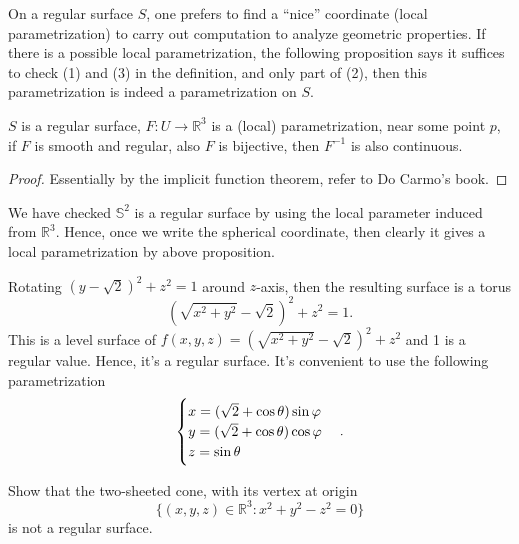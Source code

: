 On a regular surface \(S\), one prefers to find a ``nice'' coordinate
(local parametrization) to carry out computation to analyze geometric properties.
If there is a possible local parametrization, the following proposition says it
suffices to check (1) and (3) in the definition, and only part of (2), then this
parametrization is indeed a parametrization on \(S\).
\begin{prop}
    \(S\) is a regular surface, \(F\colon U\to \mathbb{R}^3\) is a (local)
    parametrization, near some point \(p\), if \(F\) is smooth and regular, also
    \(F\) is bijective, then \(F^{-1}\) is also continuous.
\end{prop}
\begin{proof}
    Essentially by the implicit function theorem, refer to Do Carmo's book.
\end{proof}

\begin{example}
    We have checked \(\mathbb{S}^2\) is a regular surface by using the local
    parameter induced from \(\mathbb{R}^3\). Hence, once we write the spherical
    coordinate, then clearly it gives a local parametrization by above proposition.
\end{example}

\begin{example}[Torus]
    Rotating \((y-\sqrt{2})^2+z^2=1\) around \(z\)-axis, then the resulting surface
    is a torus \[
        (\sqrt{x^2+y^2}-\sqrt{2})^2+z^2=1
    .\] This is a level surface of \(f(x,y,z)=(\sqrt{x^2+y^2}-\sqrt{2})^2+z^2\) and
    1 is a regular value. Hence, it's a regular surface. It's convenient to use
    the following parametrization \[
        \begin{cases}
            x=(\sqrt{2}+\cos\theta)\sin\varphi \\
            y=(\sqrt{2}+\cos\theta)\cos\varphi \\
            z=\sin\theta
        \end{cases}
    .\] 
\end{example}

\begin{exercise}[Homework]
    Show that the two-sheeted cone, with its vertex at origin \[
        \{(x,y,z)\in \mathbb{R}^3:x^2+y^2-z^2=0\}
    \] is not a regular surface.
\end{exercise}

